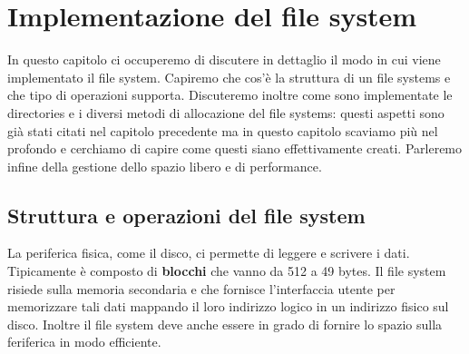 \pagebreak
\chapter{Implementazione del file system}
In questo capitolo ci occuperemo di discutere in dettaglio il modo in cui viene implementato il file system. Capiremo che cos'è la struttura di un file systems e che tipo di operazioni supporta. Discuteremo inoltre come sono implementate le directories e i diversi metodi di allocazione del file systems: questi aspetti sono già stati citati nel capitolo precedente ma in questo capitolo scaviamo più nel profondo e cerchiamo di capire come questi siano effettivamente creati. Parleremo infine della gestione dello spazio libero e di performance. 

\section{Struttura e operazioni del file system}
La periferica fisica, come il disco, ci permette di leggere e scrivere i dati. Tipicamente è composto di \textbf{blocchi} che vanno da 512 a 49 bytes. Il file system risiede sulla memoria secondaria e che fornisce l'interfaccia utente per memorizzare tali dati mappando il loro indirizzo logico in un indirizzo fisico sul disco. Inoltre il file system deve anche essere in grado di fornire lo spazio sulla feriferica in modo efficiente. 
% 
